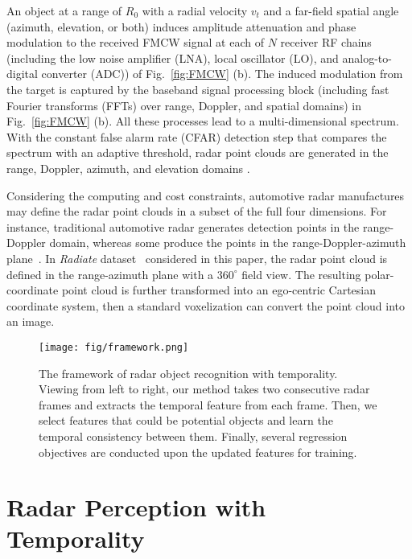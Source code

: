 \documentclass[10pt,twocolumn,letterpaper]{article}
\begin{document}
An object at a range of $R_0$ with a radial velocity $v_t$ and a far-field spatial angle (\ie azimuth, elevation, or both) induces amplitude attenuation and phase modulation to the received FMCW signal at each of $N$ receiver RF chains (including the low noise amplifier (LNA), local oscillator (LO), and analog-to-digital converter (ADC)) of Fig.~\ref{fig:FMCW} (b). The induced modulation from the target is captured by the baseband signal processing block (including fast Fourier transforms (FFTs) over range, Doppler, and spatial domains) in Fig.~\ref{fig:FMCW} (b). All these processes lead to a multi-dimensional spectrum. With the constant false alarm rate (CFAR) detection step that compares the spectrum with an adaptive threshold, radar point clouds are generated in the range, Doppler, azimuth, and elevation domains \cite{LiStoica08,WangBoufounos20,BilikLongman19}.



Considering the computing and cost constraints, automotive radar manufactures may define the radar point clouds in a subset of the full four dimensions. For instance, traditional automotive radar generates detection points in the range-Doppler domain, whereas some produce the points in the range-Doppler-azimuth plane~\cite{RamasubramanianGinsburg17}. In \textit{Radiate} dataset~\cite{sheeny2020radiate} considered in this paper, the radar point cloud is defined in the range-azimuth plane with a $360^\circ$ field view. The resulting polar-coordinate point cloud is further transformed into an ego-centric Cartesian coordinate system, then a standard voxelization can convert the point cloud into an image.



\begin{figure*}[t]
    \centering
    \texttt{[image: fig/framework.png]}
    \vspace{-4mm}
    \caption{The framework of radar object recognition with temporality. Viewing from left to right, our method takes two consecutive radar frames and extracts the temporal feature from each frame. Then, we select features that could be potential objects and learn the temporal consistency between them. Finally, several regression objectives are conducted upon the updated features for training.}
    \label{fig:framework}
    \vspace{-6mm}
\end{figure*}

\section{Radar Perception with Temporality}
\end{document}
